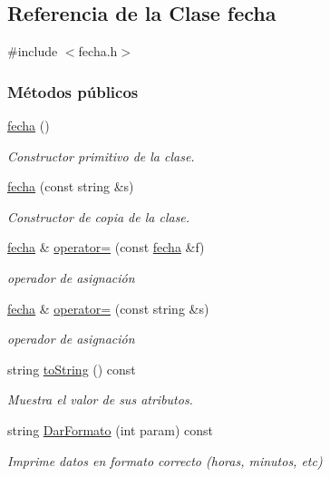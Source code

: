 \hypertarget{classfecha}{}\subsection{Referencia de la Clase fecha}
\label{classfecha}


{\ttfamily \#include $<$fecha.\+h$>$}

\subsubsection*{Métodos públicos}
\begin{DoxyCompactItemize}
\item 
\hyperlink{classfecha_a6775ef84b5838e12e28fd341793f4539}{fecha} ()
\begin{DoxyCompactList}\small\item\em Constructor primitivo de la clase. \end{DoxyCompactList}\item 
\hyperlink{classfecha_aed5c22d5eeb15f1f2927d5a2c28b74df}{fecha} (const string \&s)
\begin{DoxyCompactList}\small\item\em Constructor de copia de la clase. \end{DoxyCompactList}\item 
\hyperlink{classfecha}{fecha} \& \hyperlink{classfecha_aeb5a68104e936f98eb933b4d6856f841}{operator=} (const \hyperlink{classfecha}{fecha} \&f)
\begin{DoxyCompactList}\small\item\em operador de asignación \end{DoxyCompactList}\item 
\hyperlink{classfecha}{fecha} \& \hyperlink{classfecha_afff8905488f3d97ecfe6141f8521ac22}{operator=} (const string \&s)
\begin{DoxyCompactList}\small\item\em operador de asignación \end{DoxyCompactList}\item 
string \hyperlink{classfecha_a26d22b980284408eac0da084f358c43b}{to\+String} () const 
\begin{DoxyCompactList}\small\item\em Muestra el valor de sus atributos. \end{DoxyCompactList}\item 
string \hyperlink{classfecha_af4bb41496cd45e4f8631fdd36c70299c}{Dar\+Formato} (int param) const 
\begin{DoxyCompactList}\small\item\em Imprime datos en formato correcto (horas, minutos, etc) \end{DoxyCompactList}\item 

\end{DoxyCompactItemize}
